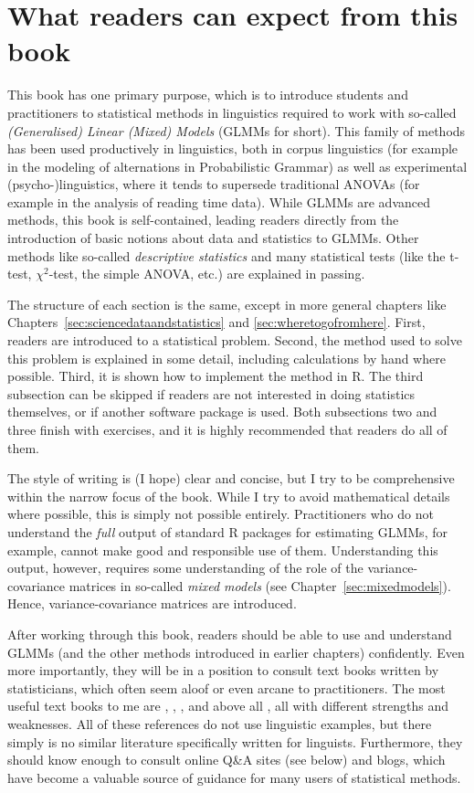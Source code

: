 
\section*{What readers can expect from this book}

This book has one primary purpose, which is to introduce students and practitioners to statistical methods in linguistics required to work with so-called \textit{(Generalised) Linear (Mixed) Models} (GLMMs for short).
This family of methods has been used productively in linguistics, both in corpus linguistics (for example in the modeling of alternations in Probabilistic Grammar) as well as experimental (psycho-)linguistics, where it tends to supersede traditional ANOVAs (for example in the analysis of reading time data).
While GLMMs are advanced methods, this book is self-contained, leading readers directly from the introduction of basic notions about data and statistics to GLMMs.
Other methods like so-called \textit{descriptive statistics} and many statistical tests (like the t-test, $\chi^2$-test, the simple ANOVA, etc.) are explained in passing.

The structure of each section is the same, except in more general chapters like Chapters~\ref{sec:sciencedataandstatistics} and \ref{sec:wheretogofromhere}.
First, readers are introduced to a statistical problem.
Second, the method used to solve this problem is explained in some detail, including calculations by hand where possible.
Third, it is shown how to implement the method in R.
The third subsection can be skipped if readers are not interested in doing statistics themselves, or if another software package is used.
Both subsections two and three finish with exercises, and it is highly recommended that readers do all of them.

The style of writing is (I hope) clear and concise, but I try to be comprehensive within the narrow focus of the book.
While I try to avoid mathematical details where possible, this is simply not possible entirely.
Practitioners who do not understand the \textit{full} output of standard R packages for estimating GLMMs, for example, cannot make good and responsible use of them.
Understanding this output, however, requires some understanding of the role of the variance-covariance matrices in so-called \textit{mixed models} (see Chapter~\ref{sec:mixedmodels}).
Hence, variance-covariance matrices are introduced.

After working through this book, readers should be able to use and understand GLMMs (and the other methods introduced in earlier chapters) confidently.
Even more importantly, they will be in a position to consult text books written by statisticians, which often seem aloof or even arcane to practitioners.
The most useful text books to me are \cite{FahrmeirEa2013}, \cite{Fox2016}, \cite{ZuurEa2009}, and above all \cite{GelmanHill2006}, all with different strengths and weaknesses.
All of these references do not use linguistic examples, but there simply is no similar literature specifically written for linguists.
Furthermore, they should know enough to consult online Q\&A sites (see below) and blogs, which have become a valuable source of guidance for many users of statistical methods.

